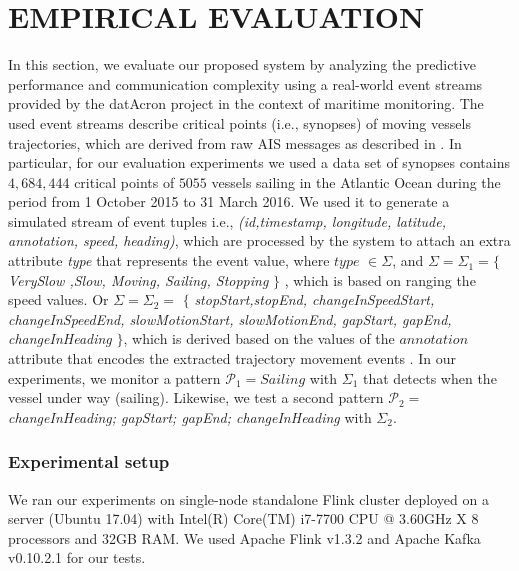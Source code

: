 \section{EMPIRICAL EVALUATION}
\label{sec:results}
In this section, we evaluate our proposed system by analyzing the predictive performance and communication complexity  using a real-world event streams provided by the datAcron project in the context of maritime monitoring. The used event streams describe critical points (i.e., synopses) of moving vessels trajectories, which are derived from raw AIS messages as described in \cite{synopses1}. In particular, for our evaluation experiments we used a data set of synopses contains $4,684,444$ critical points of $5055$ vessels sailing in the Atlantic Ocean during the period from 1 October 2015 to 31 March 2016. We used it to generate a simulated stream of event tuples  i.e., \textit{(id,timestamp, longitude, latitude, annotation, speed, heading)}, which are processed by the system to attach an extra attribute \textit{type} that represents the event value,  where $type$ $\in \Sigma$,  and $ \Sigma= \Sigma_1=$$\{$\textit{VerySlow ,Slow, Moving, Sailing, Stopping} $\}$ , which is based on ranging the speed values. Or $\Sigma=\Sigma_2=$ $\{$  \textit{stopStart,stopEnd, changeInSpeedStart, changeInSpeedEnd, slowMotionStart, slowMotionEnd, gapStart, gapEnd,   changeInHeading} $\}$, which is derived based on the values of the $annotation$ attribute that encodes the extracted trajectory movement events \cite{synopses1}. In our experiments, we monitor a pattern $\mathcal{P}_1=Sailing$ with $\Sigma_1$ that detects when the vessel under way (sailing). Likewise, we test a second pattern  $\mathcal{P}_2=$\textit{changeInHeading; gapStart; gapEnd; changeInHeading} with $\Sigma_2$.


\subsubsection*{Experimental setup} We ran our experiments on single-node standalone Flink cluster deployed on a server (Ubuntu 17.04) with Intel(R) Core(TM) i7-7700 CPU @ 3.60GHz X 8 processors and 32GB RAM. We used Apache Flink v1.3.2 and Apache Kafka v0.10.2.1 for our tests.


